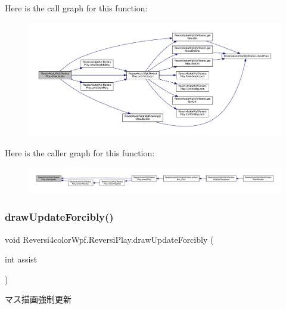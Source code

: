 Here is the call graph for this function\+:
\nopagebreak
\begin{figure}[H]
\begin{center}
\leavevmode
\includegraphics[width=350pt]{class_reversi4color_wpf_1_1_reversi_play_af579d0b931ddc4bb8e07f37254e08625_cgraph}
\end{center}
\end{figure}
Here is the caller graph for this function\+:
\nopagebreak
\begin{figure}[H]
\begin{center}
\leavevmode
\includegraphics[width=350pt]{class_reversi4color_wpf_1_1_reversi_play_af579d0b931ddc4bb8e07f37254e08625_icgraph}
\end{center}
\end{figure}
\mbox{\label{class_reversi4color_wpf_1_1_reversi_play_a4669f078f21525854defe55a689fe2de}} 
\subsubsection{\texorpdfstring{draw\+Update\+Forcibly()}{drawUpdateForcibly()}}
{\footnotesize\ttfamily void Reversi4color\+Wpf.\+Reversi\+Play.\+draw\+Update\+Forcibly (\begin{DoxyParamCaption}\item[{int}]{assist }\end{DoxyParamCaption})}



マス描画強制更新 



